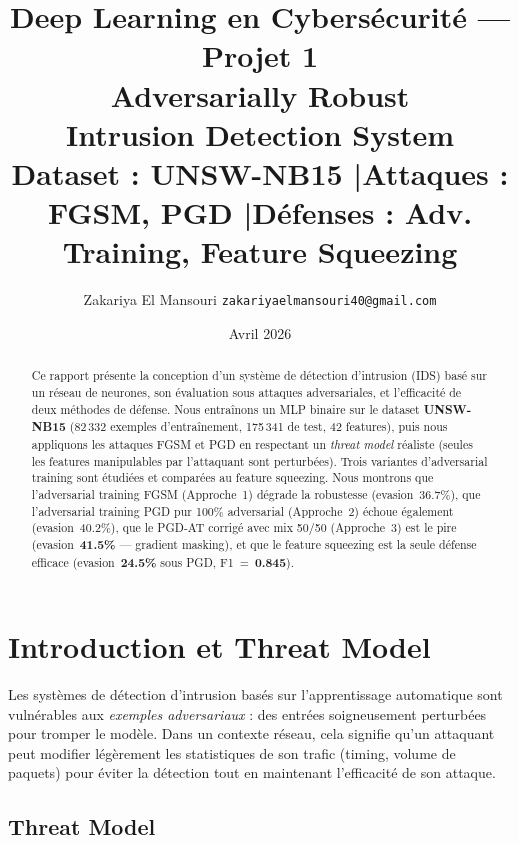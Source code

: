 \documentclass[11pt,a4paper]{article}
\title{
    \vspace{-1cm}
    {\large Deep Learning en Cybers\'ecurit\'e --- Projet 1}\\[0.4em]
    {\LARGE\bfseries\color{myblue} Adversarially Robust\\Intrusion Detection System}\\[0.6em]
    {\normalsize Dataset : UNSW-NB15 \quad|\quad Attaques : FGSM, PGD \quad|\quad D\'efenses : Adv. Training, Feature Squeezing}
}
\author{Zakariya El Mansouri \quad \texttt{zakariyaelmansouri40@gmail.com}}
\date{Avril 2026}
\begin{document}
\maketitle
\thispagestyle{fancy}

\begin{abstract}
\noindent
Ce rapport pr\'esente la conception d'un syst\`eme de d\'etection d'intrusion (IDS) bas\'e sur un r\'eseau de neurones,
son \'evaluation sous attaques adversariales, et l'efficacit\'e de deux m\'ethodes de d\'efense.
Nous entra\^inons un MLP binaire sur le dataset \textbf{UNSW-NB15} (82\,332 exemples d'entra\^inement,
175\,341 de test, 42 features), puis nous appliquons les attaques FGSM et PGD en respectant un
\emph{threat model} r\'ealiste (seules les features manipulables par l'attaquant sont perturb\'ees).
Trois variantes d'adversarial training sont \'etudi\'ees et compar\'ees au feature squeezing.
Nous montrons que l'adversarial training FGSM (Approche~1) d\'egrade la robustesse (evasion~36.7\%),
que l'adversarial training PGD pur 100\% adversarial (Approche~2) \'echoue \'egalement (evasion~40.2\%),
que le PGD-AT corrig\'e avec mix 50/50 (Approche~3) est le pire (evasion~\textbf{41.5\%} --- gradient masking),
et que le feature squeezing est la seule d\'efense efficace (evasion~\textbf{24.5\%} sous PGD, F1~=~\textbf{0.845}).
\end{abstract}

\tableofcontents
\vspace{0.5em}

\section{Introduction et Threat Model}

Les syst\`emes de d\'etection d'intrusion bas\'es sur l'apprentissage automatique sont vuln\'erables aux
\emph{exemples adversariaux} : des entr\'ees soigneusement perturb\'ees pour tromper le mod\`ele.
Dans un contexte r\'eseau, cela signifie qu'un attaquant peut modifier l\'eg\`erement les statistiques
de son trafic (timing, volume de paquets) pour \'eviter la d\'etection tout en maintenant l'efficacit\'e
de son attaque.

\subsection*{Threat Model}
\end{document}
